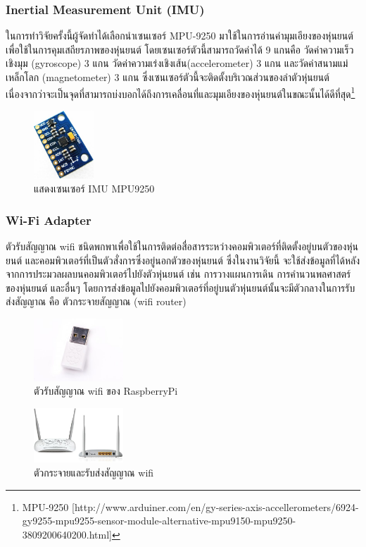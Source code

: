 \clearpage
\subsubsection*{Inertial Measurement Unit (IMU)}
ในการทำวิจัยครั้งนี้ผู้จัดทำได้เลือกนำเซนเซอร์ MPU-9250 มาใช้ในการอ่านค่ามุมเอียงของหุ่นยนต์เพื่อใช้ในการคุมเสถียรภาพของหุ่นยนต์
โดยเซนเซอร์ตัวนี้สามารถวัดค่าได้ 9 แกนคือ วัดค่าความเร็วเชิงมุม (gyroscope) 3 แกน วัดค่าความเร่งเชิงเส้น(accelerometer) 3 แกน
และวัดค่าสนามแม่เหล็กโลก (magnetometer) 3 แกน ซึ่งเซนเซอร์ตัวนี้จะติดตั้งบริเวณส่วนของลำตัวหุ่นยนต์
เนื่องจากว่าจะเป็นจุดที่สามารถบ่งบอกได้ถึงการเคลื่อนที่และมุมเอียงของหุ่นยนต์ในขณะนั้นได้ดีที่สุด\footnote{ MPU-9250 [http://www.arduiner.com/en/gy-series-axis-accellerometers/6924-gy9255-mpu9255-sensor-module-alternative-mpu9150-mpu9250-3809200640200.html] }
\begin{figure}[!ht]
    \centering
    \includegraphics[width=0.2\textwidth]{chapter3/images/mpu9250.jpeg}
    \caption{แสดงเซนเซอร์ IMU MPU9250}
    \label{fig:mpu9250}
\end{figure}

\subsubsection*{Wi-Fi Adapter}
ตัวรับสัญญาณ wifi ชนิดพกพาเพื่อใช้ในการติดต่อสื่อสารระหว่างคอมพิวเตอร์ที่ติดตั้งอยู่บนตัวของหุ่นยนต์
และคอมพิวเตอร์ที่เป็นตัวสั่งการซึ่งอยู่นอกตัวของหุ่นยนต์ ซึ่งในงานวิจัยนี้
จะใช้ส่งข้อมูลที่ได้หลังจากการประมวลผลบนคอมพิวเตอร์ไปยังตัวหุ่นยนต์ เช่น การวางแผนการเดิน การคำนวนพลศาสตร์ของหุ่นยนต์
และอื่นๆ โดยการส่งข้อมูลไปยังคอมพิวเตอร์ที่อยู่บนตัวหุ่นยนต์นั้นจะมีตัวกลางในการรับส่งสัญญาณ
คือ ตัวกระจายสัญญาณ (wifi router)
\begin{figure}[!ht]
    \centering
    \includegraphics[width=0.3\textwidth]{chapter3/images/rpi_wifi_adaptor.jpg}
    \caption{ตัวรับสัญญาณ wifi ของ RaspberryPi}
    \label{fig:rpi_wifi_adaptor}
\end{figure}
\begin{figure}[!ht]
    \centering
    \includegraphics[width=0.3\textwidth]{chapter3/images/wifi_router.jpg}
    \caption{ตัวกระจายและรับส่งสัญญาณ wifi}
    \label{fig:wifi_router}
\end{figure}



